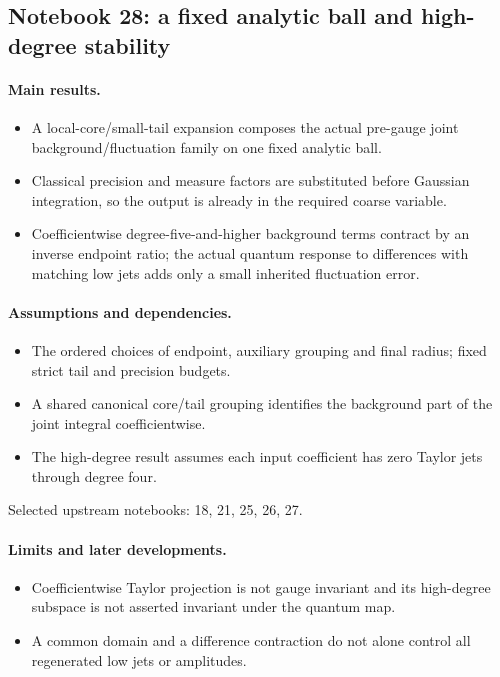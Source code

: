 \subsection{Notebook 28: a fixed analytic ball and high-degree stability}
\label{hnc-28}
\noindent{}\par

\paragraph{Main results.}
\begin{itemize}
\item A local-core/small-tail expansion composes the actual pre-gauge joint background/fluctuation family on one fixed analytic ball.
\item Classical precision and measure factors are substituted before Gaussian integration, so the output is already in the required coarse variable.
\item Coefficientwise degree-five-and-higher background terms contract by an inverse endpoint ratio; the actual quantum response to differences with matching low jets adds only a small inherited fluctuation error.
\end{itemize}

\paragraph{Assumptions and dependencies.}
\begin{itemize}
\item The ordered choices of endpoint, auxiliary grouping and final radius; fixed strict tail and precision budgets.
\item A shared canonical core/tail grouping identifies the background part of the joint integral coefficientwise.
\item The high-degree result assumes each input coefficient has zero Taylor jets through degree four.
\end{itemize}

Selected upstream notebooks: 18, 21, 25, 26, 27.\par

\paragraph{Limits and later developments.}
\begin{itemize}
\item Coefficientwise Taylor projection is not gauge invariant and its high-degree subspace is not asserted invariant under the quantum map.
\item A common domain and a difference contraction do not alone control all regenerated low jets or amplitudes.
\end{itemize}

